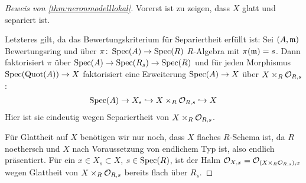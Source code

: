 
\begin{proof}[Beweis von \ref{thm:neronmodelllokal}]
  Vorerst ist zu zeigen, dass $X$ glatt und separiert ist.

  Letzteres gilt, da das Bewertungskriterium für Separiertheit
  erfüllt ist: Sei $(A,\mathfrak{m})$ Bewertungsring und über
  $\pi\colon\operatorname{Spec}(A)\to\operatorname{Spec}(R)$ $R$-Algebra mit $\pi(\mathfrak{m})=s$.
  Dann faktorisiert $\pi$ über
  $\operatorname{Spec}(A)\to\operatorname{Spec}(R_s)\to\operatorname{Spec}(R)$ und für jeden Morphismus
  $\operatorname{Spec}(\operatorname{Quot}(A))\to X$ faktorisiert eine Erweiterung
  $\operatorname{Spec}(A)\to X$ über $X\times_R\mathcal{O}_{R,s}$:
  \begin{gather*}
    \operatorname{Spec}(A)\to X_s\hookrightarrow X\times_R\mathcal{O}_{R,s}\hookrightarrow X
  \end{gather*}
  Hier ist sie eindeutig wegen
  Separiertheit von $X\times_R\mathcal{O}_{R,s}$.

  Für Glattheit auf $X$ benötigen wir nur noch, dass $X$ flaches
  $R$-Schema ist, da $R$ noethersch und $X$ nach Voraussetzung von
  endlichem Typ ist, also endlich präsentiert.
  Für ein $x\in X_s\subset X$, $s\in\operatorname{Spec}(R)$, ist der Halm
  $\mathcal{O}_{X,x}=\mathcal{O}_{(X\times_R\mathcal{O}_{R,s}),x}$ wegen Glattheit von
  $X\times_R\mathcal{O}_{R,s}$ bereits flach über $R_s$.


\end{proof}
